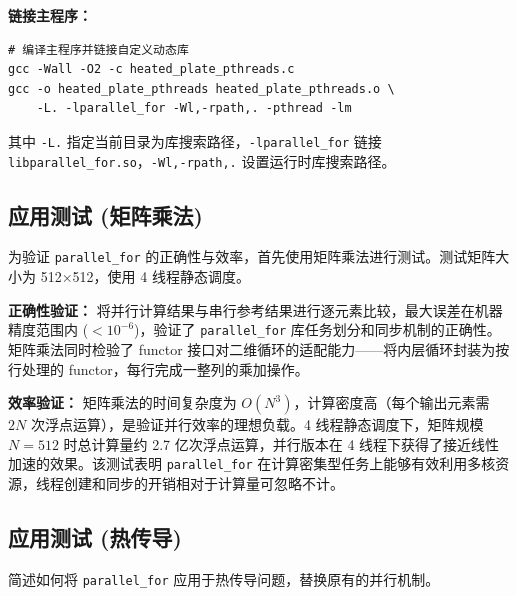 \documentclass{SYSUReport}
\begin{document}
\textbf{链接主程序：}
\begin{verbatim}
# 编译主程序并链接自定义动态库
gcc -Wall -O2 -c heated_plate_pthreads.c
gcc -o heated_plate_pthreads heated_plate_pthreads.o \
    -L. -lparallel_for -Wl,-rpath,. -pthread -lm
\end{verbatim}

其中 \texttt{-L.} 指定当前目录为库搜索路径，\texttt{-lparallel\_for} 链接 \texttt{libparallel\_for.so}，\texttt{-Wl,-rpath,.} 设置运行时库搜索路径。

\subsection{应用测试 (矩阵乘法)}
为验证 \texttt{parallel\_for} 的正确性与效率，首先使用矩阵乘法进行测试。测试矩阵大小为 512×512，使用 4 线程静态调度。

\textbf{正确性验证：} 将并行计算结果与串行参考结果进行逐元素比较，最大误差在机器精度范围内 ($<10^{-6}$)，验证了 \texttt{parallel\_for} 库任务划分和同步机制的正确性。矩阵乘法同时检验了 functor 接口对二维循环的适配能力——将内层循环封装为按行处理的 functor，每行完成一整列的乘加操作。

\textbf{效率验证：} 矩阵乘法的时间复杂度为 $O(N^3)$，计算密度高（每个输出元素需 $2N$ 次浮点运算），是验证并行效率的理想负载。4 线程静态调度下，矩阵规模 $N=512$ 时总计算量约 2.7 亿次浮点运算，并行版本在 4 线程下获得了接近线性加速的效果。该测试表明 \texttt{parallel\_for} 在计算密集型任务上能够有效利用多核资源，线程创建和同步的开销相对于计算量可忽略不计。

\subsection{应用测试 (热传导)}
简述如何将 \texttt{parallel\_for} 应用于热传导问题，替换原有的并行机制。
\end{document}
